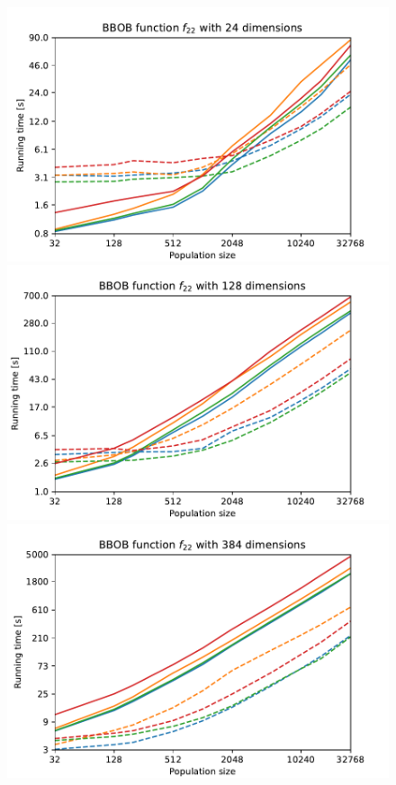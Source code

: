 \begin{figure}[ht!]
    \begin{minipage}[t]{0.32\textwidth}
        \centering
        \includegraphics[width=\textwidth]{img/runs/time_es_mutation_fn22_24d.pdf}
    \end{minipage}
    \hfill
    \begin{minipage}[t]{0.32\textwidth}
        \centering
        \includegraphics[width=\textwidth]{img/runs/time_es_mutation_fn22_128d.pdf}
    \end{minipage}
    \hfill
    \begin{minipage}[t]{0.32\textwidth}
        \centering
        \includegraphics[width=\textwidth]{img/runs/time_es_mutation_fn22_384d.pdf}
    \end{minipage}


\end{figure}
